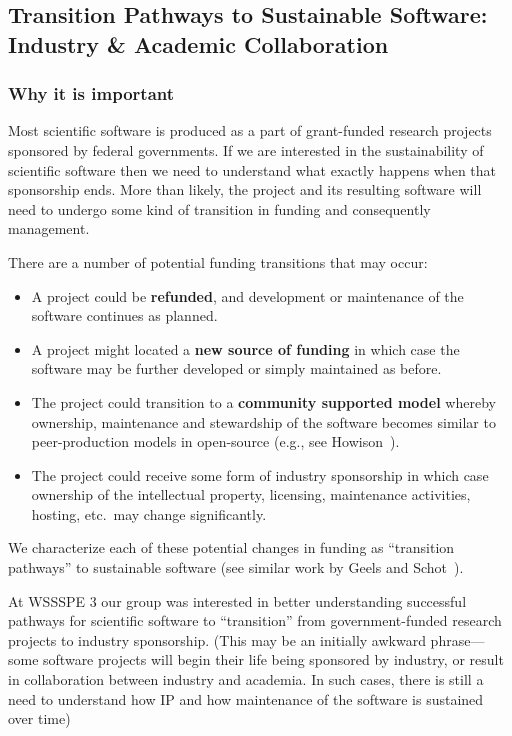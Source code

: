 \subsection{Transition Pathways to Sustainable Software: Industry \& Academic Collaboration} 

\subsubsection{Why it is important}

Most scientific software is produced as a part of grant-funded research projects sponsored by federal governments. If we are interested in the sustainability of scientific software then we need to understand what exactly happens when that sponsorship ends. More than likely, the project and its resulting software will need to undergo some kind of transition in funding and consequently management. 

There are a number of potential funding transitions that may occur:  

\begin{itemize}
\item A project could be \textbf{refunded}, and development or maintenance of the software continues as planned.
\item A project might located a \textbf{new source of funding} in which case the software may be further developed or simply maintained as before. 
\item The project could transition to a \textbf{community supported model} whereby ownership, maintenance and stewardship of the software becomes similar to peer-production models in open-source (e.g., see Howison~\cite{howison_sustaining_2015}).
\item The project could receive some form of industry sponsorship in which case ownership of the intellectual property, licensing, maintenance activities, hosting, etc.\ may change significantly. 
\end{itemize}

We characterize each of these potential changes in funding as ``transition pathways'' to sustainable software (see similar work by Geels and Schot~\cite{Geels:2007}). 

At WSSSPE 3 our group was interested in better understanding successful pathways for scientific software to ``transition'' from government-funded research projects to industry sponsorship. 
(This may be an initially awkward phrase---some software projects will begin their life being sponsored by industry, or result in collaboration between industry and academia. 
In such cases, there is still a need to understand how IP and how maintenance of the software is sustained over time)

